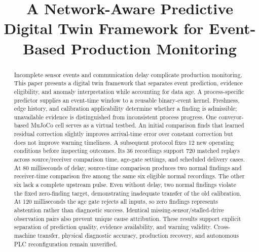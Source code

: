 \title{A Network-Aware Predictive Digital Twin Framework for Event-Based Production Monitoring}
\author{\mbox{}}
\authorrunning{}
\institute{\mbox{}}
\maketitle
\begin{abstract}
Incomplete sensor events and communication delay complicate production monitoring. This paper presents a digital twin framework that separates event prediction, evidence eligibility, and anomaly interpretation while accounting for data age. A process-specific predictor supplies an event-time window to a reusable binary-event kernel. Freshness, edge history, and calibration applicability determine whether a finding is admissible; unavailable evidence is distinguished from inconsistent process progress. One conveyor-based MuJoCo cell serves as a virtual testbed. An initial comparison finds that learned residual correction slightly improves arrival-time error over constant correction but does not improve warning timeliness. A subsequent protocol fixes 12 new operating conditions before inspecting outcomes. Its 36 recordings support 720 matched replays across source/receiver comparison time, age-gate settings, and scheduled delivery cases. At 80 milliseconds of delay, source-time comparison produces two normal findings and receiver-time comparison five among the same six eligible normal recordings. The other six lack a complete upstream pulse. Even without delay, two normal findings violate the fixed zero-finding target, demonstrating inadequate transfer of the old calibration. At 120 milliseconds the age gate rejects all inputs, so zero findings represents abstention rather than diagnostic success. Identical missing-sensor/stalled-drive observation pairs also prevent unique cause attribution. These results support explicit separation of prediction quality, evidence availability, and warning validity. Cross-machine transfer, physical diagnostic accuracy, production recovery, and autonomous PLC reconfiguration remain unverified.
\end{abstract}
